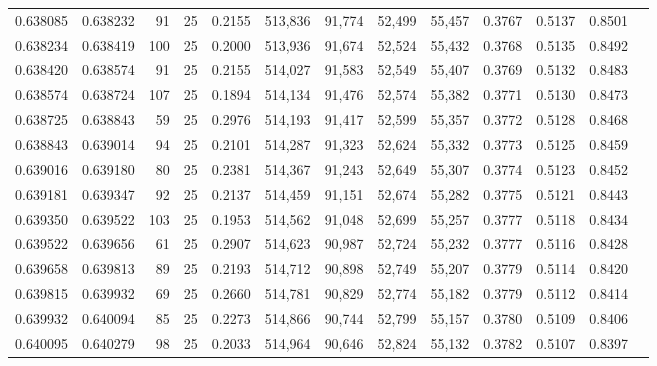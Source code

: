 \begin{tabular}{rrrrrrrrrrrrr}
0.638085 & 0.638232 &    91 &  25 &                                     0.2155 & 513,836 &  91,774 &  52,499 &  55,457 & 0.3767 & 0.5137 & 0.8501 \\
0.638234 & 0.638419 &   100 &  25 &                                     0.2000 & 513,936 &  91,674 &  52,524 &  55,432 & 0.3768 & 0.5135 & 0.8492 \\
0.638420 & 0.638574 &    91 &  25 &                                     0.2155 & 514,027 &  91,583 &  52,549 &  55,407 & 0.3769 & 0.5132 & 0.8483 \\
0.638574 & 0.638724 &   107 &  25 &                                     0.1894 & 514,134 &  91,476 &  52,574 &  55,382 & 0.3771 & 0.5130 & 0.8473 \\
0.638725 & 0.638843 &    59 &  25 &                                     0.2976 & 514,193 &  91,417 &  52,599 &  55,357 & 0.3772 & 0.5128 & 0.8468 \\
0.638843 & 0.639014 &    94 &  25 &                                     0.2101 & 514,287 &  91,323 &  52,624 &  55,332 & 0.3773 & 0.5125 & 0.8459 \\
0.639016 & 0.639180 &    80 &  25 &                                     0.2381 & 514,367 &  91,243 &  52,649 &  55,307 & 0.3774 & 0.5123 & 0.8452 \\
0.639181 & 0.639347 &    92 &  25 &                                     0.2137 & 514,459 &  91,151 &  52,674 &  55,282 & 0.3775 & 0.5121 & 0.8443 \\
0.639350 & 0.639522 &   103 &  25 &                                     0.1953 & 514,562 &  91,048 &  52,699 &  55,257 & 0.3777 & 0.5118 & 0.8434 \\
0.639522 & 0.639656 &    61 &  25 &                                     0.2907 & 514,623 &  90,987 &  52,724 &  55,232 & 0.3777 & 0.5116 & 0.8428 \\
0.639658 & 0.639813 &    89 &  25 &                                     0.2193 & 514,712 &  90,898 &  52,749 &  55,207 & 0.3779 & 0.5114 & 0.8420 \\
0.639815 & 0.639932 &    69 &  25 &                                     0.2660 & 514,781 &  90,829 &  52,774 &  55,182 & 0.3779 & 0.5112 & 0.8414 \\
0.639932 & 0.640094 &    85 &  25 &                                     0.2273 & 514,866 &  90,744 &  52,799 &  55,157 & 0.3780 & 0.5109 & 0.8406 \\
0.640095 & 0.640279 &    98 &  25 &                                     0.2033 & 514,964 &  90,646 &  52,824 &  55,132 & 0.3782 & 0.5107 & 0.8397 \\

\end{tabular}
